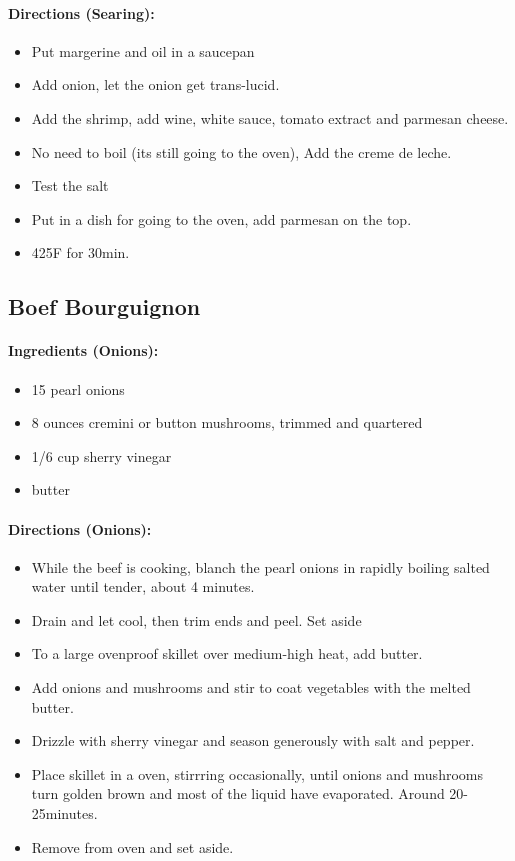 \documentclass{article}
\begin{document}
\paragraph{Directions (Searing):}
\begin{itemize}
	\item Put margerine and oil in a saucepan
	\item Add onion, let the onion get trans-lucid.
	\item Add the shrimp, add wine, white sauce, tomato extract and parmesan cheese.
	\item No need to boil (its still going to the oven), Add the creme de leche.
	\item Test the salt
	\item Put in a dish for going to the oven, add parmesan on the top.
	\item 425F for 30min.
\end{itemize}

\subsection{Boef Bourguignon}

\paragraph{Ingredients (Onions):}
\begin{itemize}
	\item 15 pearl onions
	\item 8 ounces cremini or button mushrooms, trimmed and quartered
	\item 1/6 cup sherry vinegar
	\item butter
\end{itemize}


\paragraph{Directions (Onions):}
\begin{itemize}
	\item While the beef is cooking, blanch the pearl onions in rapidly boiling salted water until tender, about 4 minutes. 
	\item Drain and let cool, then trim ends and peel. Set aside
	\item To a large ovenproof skillet over medium-high heat, add butter.
	\item Add onions and mushrooms and stir to coat vegetables with the melted butter.
	\item Drizzle with sherry vinegar and season generously with salt and pepper.
	\item Place skillet in a oven, stirrring occasionally, until onions and mushrooms turn golden brown and most of the liquid have evaporated. Around 20-25minutes.
	\item Remove from oven and set aside.
\end{itemize}
\end{document}
